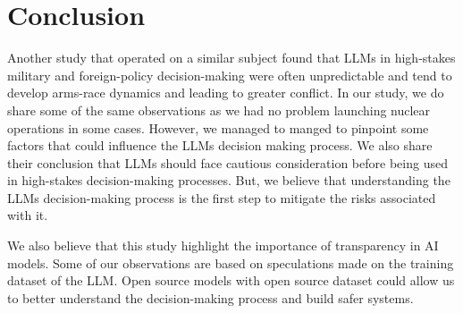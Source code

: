 \section{Conclusion}

Another study that operated on a similar subject found that LLMs in high-stakes military and foreign-policy decision-making were often unpredictable and tend to develop arms-race dynamics and leading to greater conflict\cite{Rivera_2024}. In our study, we do share some of the same observations as we had no problem launching nuclear operations in some cases. However, we managed to manged to pinpoint some factors that could influence the LLMs decision making process. We also share their conclusion that LLMs should face cautious consideration before being used in high-stakes decision-making processes. But, we believe that understanding the LLMs decision-making process is the first step to mitigate the risks associated with it.

We also believe that this study highlight the importance of transparency in AI models. Some of our observations are based on speculations made on the training dataset of the LLM. Open source models with open source dataset could allow us to better understand the decision-making process and build safer systems.